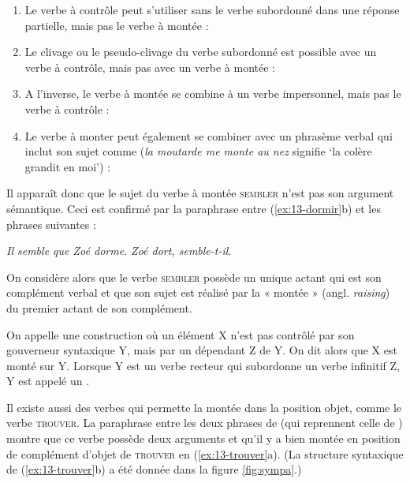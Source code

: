 \begin{enumerate}[label=(\arabic*)]
\item	Le verbe à contrôle peut s’utiliser sans le verbe subordonné dans une réponse partielle, mais pas le verbe à montée :
\ea{}
\z\z

\item	Le clivage ou le pseudo-clivage du verbe subordonné est possible avec un verbe à contrôle, mais pas avec un verbe à montée :
\ea{}
\z\z

\item	A l’inverse, le verbe à montée se combine à un verbe impersonnel, mais pas le verbe à contrôle :
\ea{}
\z\z

\item	Le verbe à monter peut également se combiner avec un phrasème verbal qui inclut son sujet comme  (\textit{la moutarde me monte au nez} signifie ‘la colère grandit en moi’) :
\ea{}
\z\z

\end{enumerate}

Il apparaît donc que le sujet du verbe à montée \textsc{sembler} n’est pas son argument sémantique. Ceci est confirmé par la paraphrase entre (\ref{ex:13-dormir}b) et les phrases suivantes :

\ea\ea \textit{Il semble que Zoé dorme.}
\ex \textit{Zoé dort, semble-t-il.}\z\z

On considère alors que le verbe \textsc{sembler} possède un unique actant qui est son complément verbal et que son sujet est réalisé par la « montée » (angl. \textit{raising}) du premier actant de son complément. 

{On appelle  une construction où un élément X n’est pas contrôlé par son gouverneur syntaxique Y, mais par un dépendant Z de Y. On dit alors que X est monté sur Y. Lorsque Y est un verbe recteur qui subordonne un verbe infinitif Z, Y est appelé un .}

Il existe aussi des verbes qui permette la montée dans la position objet, comme le verbe \textsc{trouver}. La paraphrase entre les deux phrases de  (qui reprennent celle de ) montre que ce verbe possède deux arguments et qu’il y a bien montée en position de complément d’objet de \textsc{trouver} en (\ref{ex:13-trouver}a). (La structure syntaxique de (\ref{ex:13-trouver}b) a été donnée dans la figure \ref{fig:sympa}.)

